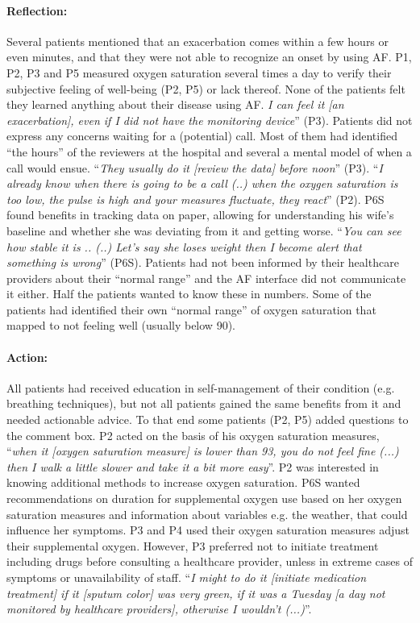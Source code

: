\paragraph{Reflection:} 
Several patients mentioned that an exacerbation comes within a few hours or even minutes, and that they were not able to recognize an onset by using AF. P1, P2, P3 and P5 measured oxygen saturation several times a day to verify their subjective feeling of well-being (P2, P5) or lack thereof. None of the patients felt they learned anything about their disease using AF. \textit{I can feel it [an exacerbation], even if I did not have the monitoring device}” (P3). Patients did not express any concerns waiting for a (potential) call. Most of them had identified “the hours” of the reviewers at the hospital and several a mental model of when a call would ensue. “\textit{They usually do it [review the data] before noon}” (P3). “\textit{I already know when there is going to be a call (..) when the oxygen saturation is too low, the pulse is high and your measures fluctuate, they react}” (P2). P6S found benefits in tracking data on paper, allowing for understanding his wife’s baseline and whether she was deviating from it and getting worse. “\textit{You can see how stable it is .. (..) Let’s say she loses weight then I become alert that something is wrong}” (P6S). Patients had not been informed by their healthcare providers about their “normal range” and the AF interface did not communicate it either. Half the patients wanted to know these in numbers. Some of the patients had identified their own “normal range” of oxygen saturation that mapped to not feeling well (usually below 90). 

\paragraph{Action:} 
All patients had received education in self-management of their condition (e.g. breathing techniques), but not all patients gained the same benefits from it and needed actionable advice. To that end some patients (P2, P5) added questions to the comment box. P2 acted on the basis of his oxygen saturation measures, “\textit{when it [oxygen saturation measure] is lower than 93, you do not feel fine (...) then I walk a little slower and take it a bit more easy}”. P2 was interested in knowing additional methods to increase oxygen saturation. P6S wanted recommendations on duration for supplemental oxygen use based on her oxygen saturation measures and information about variables e.g. the weather, that could influence her symptoms. P3 and P4 used their oxygen saturation measures adjust their supplemental oxygen. However, P3 preferred not to initiate treatment including drugs before consulting a healthcare provider, unless in extreme cases of symptoms or unavailability of staff. “\textit{I might to do it [initiate medication treatment] if it [sputum color] was very green, if it was a Tuesday [a day not monitored by healthcare providers], otherwise I wouldn’t (...)}”.

